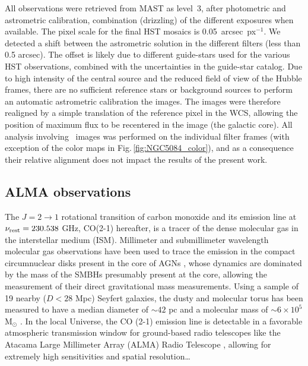 \documentclass[modern]{CORE-AAS/aastex631}
\begin{document}
{All observations were retrieved from MAST as level~3, after photometric and astrometric calibration, combination (drizzling) of the different exposures when available. The pixel scale for the final HST mosaics is 0.05~arcsec~px$^{-1}$. We detected a shift between the astrometric solution in the different filters (less than 0.5 arcsec). The offset is likely due to different guide-stars used for the various HST observations, combined with the uncertainties in the guide-star catalog. Due to high intensity of the central source and the reduced field of view of the Hubble frames, there are no sufficient reference stars or background sources to perform an automatic astrometric calibration the images. The images were therefore realigned by a simple translation of the reference pixel in the WCS, allowing the position of maximum flux to be recentered in the image (the galactic core). All analysis involving \Hubble\ images was performed on the individual filter frames (with exception of the color maps in Fig.\,\ref{fig:NGC5084_color}), and as a consequence their relative alignment does not impact the results of the present work.

\subsection{ALMA observations} \label{subsec:data_ALMA}

The $J = 2 \rightarrow 1$ rotational transition of carbon monoxide and its emission line at $\nu_{\rm rest} = 230.538$ GHz, CO(2-1) hereafter, is a tracer of the dense molecular gas in the interstellar medium (ISM). Millimeter and submillimeter wavelength molecular gas observations have been used to trace the emission in the compact circumnuclear disks present in the core of AGNs \citep{garciaburillo+2021aap652_98}, whose dynamics are dominated by the mass of the SMBHs presumably present at the core, allowing the measurement of their direct gravitational mass \citep{davis+2013nat494_328,onishi+2015apj806_39} measurements. Using a sample of 19 nearby ($D<28$ Mpc) Seyfert galaxies, the dusty and molecular torus has been measured to have a median diameter of $\sim42$ pc and a molecular mass of $\sim6\times10^{5}$ M$_{\odot}$ \citep{garciaburillo+2021aap652_98}. In the local Universe, the CO (2-1) emission line is detectable in a favorable atmospheric transmission window for ground-based radio telescopes like the Atacama Large Millimeter Array (ALMA) Radio Telescope \citep{leroy+2021apj257_43}, allowing for extremely high sensitivities and spatial resolution…

}
\end{document}
